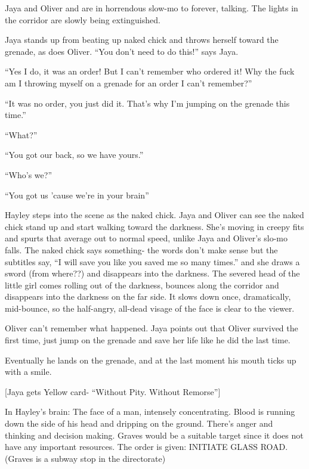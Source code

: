 
Jaya and Oliver and are in horrendous slow-mo to forever, talking.   The lights in the corridor are slowly being extinguished.



Jaya stands up from beating up naked chick and throws herself toward the grenade, as does Oliver.  ``You don't need to do this!'' says Jaya.

``Yes I do, it was an order!  But I can't remember who ordered it!  Why the fuck am I throwing myself on a grenade for an order I can't remember?''

``It was no order, you just did it.  That's why I'm jumping on the grenade this time.''

``What?''

``You got our back, so we have yours.''

``Who's we?''

``You got us 'cause we're in your brain''



Hayley steps into the scene as the naked chick.  Jaya and Oliver can see the naked chick stand up and start walking toward the darkness.  She's moving in creepy fits and spurts that average out to normal speed, unlike Jaya and Oliver's slo-mo falls.  The naked chick says something- the words don't make sense but the subtitles say, ``I will save you like you saved me so many times.'' and she draws a sword (from where??) and disappears into the darkness.  The severed head of the little girl comes rolling out of the darkness, bounces along the corridor and disappears into the darkness on the far side. It slows down once, dramatically, mid-bounce, so the half-angry, all-dead visage of the face is clear to the viewer.



Oliver can't remember what happened.  Jaya points out that Oliver survived the first time, just jump on the grenade and save her life like he did the last time. 



Eventually he lands on the grenade, and at the last moment his mouth ticks up with a smile.  



{[}Jaya gets Yellow card- ``Without Pity. Without Remorse''{]}



 In Hayley's brain:  The face of a man, intensely concentrating.  Blood is running down the side of his head and dripping on the ground.  There's anger and thinking and decision making.  Graves would be a suitable target since it does not have any important resources.  The order is given: INITIATE GLASS ROAD. (Graves is a subway stop in the directorate) 



